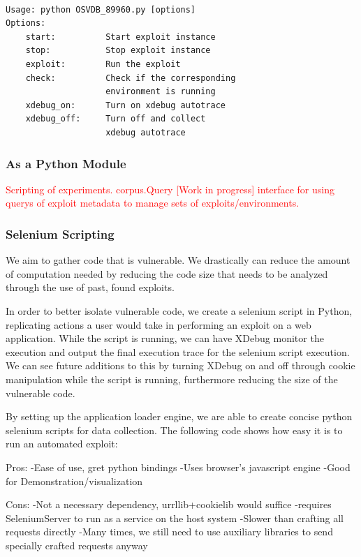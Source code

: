 \documentclass[letterpaper,twocolumn,10pt]{article}
\begin{document}
{\tt \small
\begin{verbatim}
Usage: python OSVDB_89960.py [options]
Options:
    start:          Start exploit instance
    stop:           Stop exploit instance
    exploit:        Run the exploit
    check:          Check if the corresponding 
                    environment is running
    xdebug_on:      Turn on xdebug autotrace
    xdebug_off:     Turn off and collect 
                    xdebug autotrace
\end{verbatim}
}

\subsubsection{As a Python Module}
\textcolor{red}{
Scripting of experiments. corpus.Query [Work in progress] interface for using querys of exploit metadata to manage sets of exploits/environments. 
}


\subsubsection{Selenium Scripting}

We aim to gather code that is vulnerable.  We drastically can reduce the amount of computation needed by reducing the code size that needs to be analyzed through the use of past, found exploits.  

In order to better isolate vulnerable code, we create a selenium script in Python, replicating actions a user would take in performing an exploit on a web application.  While the script is running, we can have XDebug monitor the execution and output the final execution trace for the selenium script execution.  We can see future additions to this by turning XDebug on and off through cookie manipulation while the script is running, furthermore reducing the size of the vulnerable code.

By setting up the application loader engine, we are able to create concise python selenium scripts for data collection.  The following code shows how easy it is to run an automated exploit:

Pros:
-Ease of use, gret python bindings
-Uses browser's javascript engine
-Good for Demonstration/visualization

Cons:
-Not a necessary dependency, urrllib+cookielib would suffice
-requires SeleniumServer to run as a service on the host system
-Slower than crafting all requests directly
-Many times, we still need to use auxiliary libraries to send specially crafted requests anyway
\end{document}
